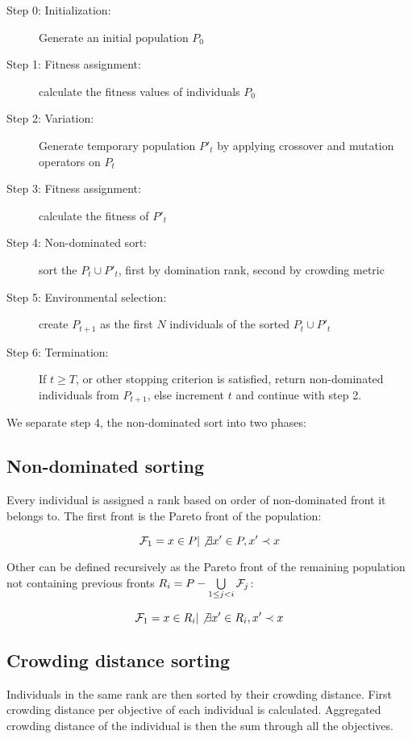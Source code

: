\documentclass[12pt,oneside]{fithesis2}
\begin{document}
\begin{description}
	\item[Step 0: Initialization:] Generate an initial population $P_0$ 
	\item[Step 1: Fitness assignment:] calculate the fitness values of individuals $P_0$
	\item[Step 2: Variation:] Generate temporary population $P'_t$ by applying crossover and mutation operators on $P_t$
	\item[Step 3: Fitness assignment:] calculate the fitness of $P'_t$
	\item[Step 4: Non-dominated sort:] sort the $P_t \cup P'_t$, first by domination rank, second by crowding metric
	\item[Step 5: Environmental selection:] create $P_{t+1}$ as the first $N$ individuals of the sorted $P_t \cup P'_t$
	\item[Step 6: Termination:] If $t \geq T$, or other stopping criterion is satisfied, return non-dominated individuals from $P_{t+1}$, else increment $t$ and continue with step 2.
\end{description}

We separate step 4, the non-dominated sort into two phases:

\subsection{Non-dominated sorting}
Every individual is assigned a rank based on order of non-dominated front it belongs to. The first front is the Pareto front of the population:

$${\cal{F}}_1 = {x \in P | \not \exists x' \in P, x' \prec x} $$

Other can be defined recursively as the Pareto front of the remaining population not containing previous fronts $R_i = P - \bigcup\limits_{1\leq j < i} {\cal{F}}_j$:

$${\cal{F}}_1 = {x \in R_i | \not \exists x' \in R_i, x' \prec x} $$

\subsection{Crowding distance sorting}

Individuals in the same rank are then sorted by their crowding distance. First crowding distance per objective of each individual is calculated. Aggregated crowding distance of the individual is then the sum through all the objectives.
\end{document}

